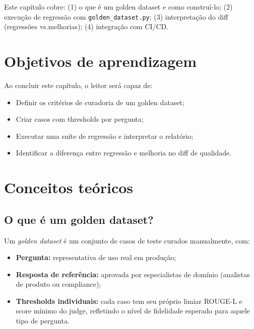 Este cap\'itulo cobre: (1) o que \'e um golden dataset e como
constru\'i-lo; (2) execu\c{c}\~ao de regress\~ao com
\texttt{golden\_dataset.py}; (3) interpreta\c{c}\~ao do diff
(regress\~oes vs.\@ melhorias); (4) integra\c{c}\~ao com CI/CD.

\section{Objetivos de aprendizagem}

Ao concluir este cap\'itulo, o leitor ser\'a capaz de:

\begin{itemize}[leftmargin=*]
  \item Definir os crit\'erios de curadoria de um golden dataset;
  \item Criar casos com thresholds por pergunta;
  \item Executar uma su\'ite de regress\~ao e interpretar o
        relat\'orio;
  \item Identificar a diferen\c{c}a entre regress\~ao e melhoria
        no diff de qualidade.
\end{itemize}

\section{Conceitos te\'oricos}

\subsection{O que \'e um golden dataset?}

Um \textit{golden dataset} \'e um
conjunto de casos de teste curados manualmente, com:

\begin{itemize}[leftmargin=*]
  \item \textbf{Pergunta:} representativa de uso real em produ\c{c}\~ao;
  \item \textbf{Resposta de refer\^encia:} aprovada por especialistas
        de dom\'inio (analistas de produto ou compliance);
  \item \textbf{Thresholds individuais:} cada caso tem seu pr\'oprio
        limiar ROUGE-L e score m\'inimo do judge, refletindo o
        n\'ivel de fidelidade esperado para aquele tipo de pergunta.
\end{itemize}

